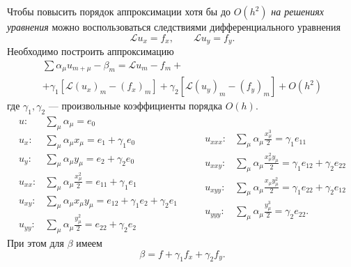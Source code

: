 \documentclass[12pt]{article}
\begin{document}
Чтобы повысить порядок аппроксимации хотя бы до $O(h^2)$ \emph{на решениях уравнения} можно воспользоваться следствиями дифференциального уравнения
\[
\mathcal{L} u_x = f_x, \qquad \mathcal{L} u_y = f_y.
\]
Необходимо построить аппроксимацию
\begin{multline*}
\sum \alpha_\mu u_{m+\mu} - \beta_m = \mathcal{L} u_m - f_m + \\
+ \gamma_1 \left[\mathcal{L} (u_x)_m - (f_x)_m\right]
+ \gamma_2 \left[\mathcal{L} (u_y)_m - (f_y)_m\right]
+ O(h^2)
\end{multline*}
где $\gamma_1, \gamma_2$ --- произвольные коэффициенты порядка $O(h)$.
\[
\begin{aligned}
u: &\sum_\mu \alpha_\mu = e_0\\
u_x: &\sum_\mu \alpha_\mu x_\mu = e_1 + \gamma_1 e_0\\
u_y: &\sum_\mu \alpha_\mu y_\mu = e_2 + \gamma_2 e_0\\
u_{xx}: &\sum_\mu \alpha_\mu \frac{x_\mu^2}{2} = e_{11} + \gamma_1 e_1\\
u_{xy}: &\sum_\mu \alpha_\mu x_\mu y_\mu = e_{12} + \gamma_1 e_2 + \gamma_2 e_1\\
u_{yy}: &\sum_\mu \alpha_\mu \frac{y_\mu^2}{2} = e_{22} + \gamma_2 e_2
\end{aligned}
\qquad
\begin{aligned}
u_{xxx}: &\sum_\mu \alpha_\mu \frac{x_\mu^3}{2} = \gamma_1 e_{11}\\
u_{xxy}: &\sum_\mu \alpha_\mu \frac{x_\mu^2 y_\mu}{2} = \gamma_1 e_{12} + \gamma_2 e_{22}\\
u_{xyy}: &\sum_\mu \alpha_\mu \frac{x_\mu y_\mu^2}{2} = \gamma_1 e_{22} + \gamma_2 e_{12}\\
u_{yyy}: &\sum_\mu \alpha_\mu \frac{y_\mu^3}{2} = \gamma_2 e_{22}.
\end{aligned}
\]
При этом для $\beta$ имеем
\[
\beta = f + \gamma_1 f_x + \gamma_2 f_y.
\]
\end{document}
